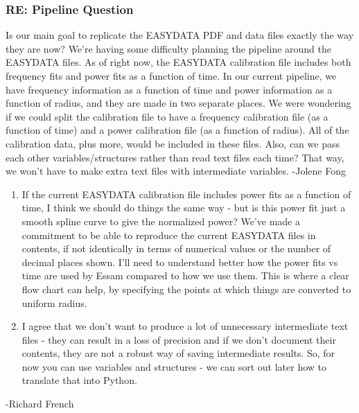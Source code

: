 \documentclass[crop=false,class=article,oneside]{standalone}
\begin{document}
\subsubsection{\footnotesize RE: Pipeline Question}
Is our main goal to replicate the EASYDATA PDF and data files exactly the way they are now? We’re having some difficulty planning the pipeline around the EASYDATA files. As of right now, the EASYDATA calibration file includes both frequency fits and power fits as a function of time. In our current pipeline, we have frequency information as a function of time and power information as a function of radius, and they are made in two separate places. We were wondering if we could split the calibration file to have a frequency calibration file (as a function of time) and a power calibration file (as a function of radius). All of the calibration data, plus more, would be included in these files. Also, can we pass each other variables/structures rather than read text files each time? That way, we won’t have to make extra text files with intermediate variables. -Jolene Fong
\begin{enumerate}
    \item If the current EASYDATA calibration file includes power fits as a function of time, I think we should do things the same way - but is this power fit just a smooth spline curve to give the normalized power? We've made a commitment to be able to reproduce the current EASYDATA files in contents, if not identically in terms of numerical values or the number of decimal places shown. I'll need to understand better how the power fits vs time are used by Essam compared to how we use them. This is where a clear flow chart can help, by specifying the points at which things are converted to uniform radius.
    \item I agree that we don't want to produce a lot of unnecessary intermediate text files - they can result in a loss of precision and if we don't document their contents, they are not a robust way of saving intermediate results. So, for now you can use variables and structures - we can sort out later how to translate that into Python.
\end{enumerate}
-Richard French
\end{document}
